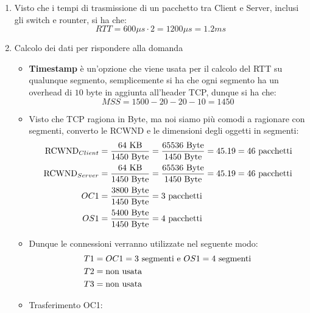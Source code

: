 \documentclass[10pt]{article}
\begin{document}
	\begin{enumerate}
		\item Visto che i tempi di trasmissione di un pacchetto tra Client e Server, inclusi gli switch e rounter, si ha che: $$RTT = 600 \mu s \cdot 2 = 1200 \mu s = 1.2 ms$$
		\item Calcolo dei dati per rispondere alla domanda
		\begin{itemize}
			\item  \textbf{Timestamp} è un'opzione che viene usata per il calcolo del RTT su qualunque segmento, semplicemente si ha che ogni segmento ha un overhead di $10$ byte in aggiunta all'header TCP, dunque si ha che: $$MSS = 1500 - 20 - 20 - 10 = 1450$$
		\item Visto che TCP ragiona in Byte, ma noi siamo più comodi a ragionare con segmenti, converto le RCWND e le dimensioni degli oggetti in segmenti:
		 	\begin{equation}
			\notag
			\begin{split}
				\textrm{RCWND}_{Client} & = \frac{64 \textrm{ KB}}{1450 \textrm{ Byte}} = \frac{65536 \textrm{ Byte}}{1450 \textrm{ Byte}} = 45.19 = 46 \textrm{ pacchetti}\\
				\textrm{RCWND}_{Server} & = \frac{64 \textrm{ KB}}{1450 \textrm{ Byte}} = \frac{65536 \textrm{ Byte}}{1450 \textrm{ Byte}} = 45.19 = 46 \textrm{ pacchetti}\\
				OC1 & = \frac{3800 \textrm{ Byte}}{1450 \textrm{ Byte}} = 3 \textrm{ pacchetti}\\
				OS1 & = \frac{5400 \textrm{ Byte}}{1450 \textrm{ Byte}} = 4 \textrm{ pacchetti}\\  
			\end{split}
			\end{equation}
			\item Dunque le connessioni verranno utilizzate nel seguente modo:
			\begin{equation}
				\notag
				\begin{split}
				T1 & = OC1 = 3 \textrm{ segmenti e } OS1 = 4 \textrm{ segmenti} \\
				T2 & = \textrm{non usata} \\
				T3 & = \textrm{non usata}
				\end{split}
			\end{equation}
			\item Trasferimento OC1:
			\begin{center}
				\centering
 				\begin{tabular}{@{} *{3}{c} @{}}
 				\toprule

\end{tabular}
\end{center}
\end{itemize}
\end{enumerate}
\end{document}
